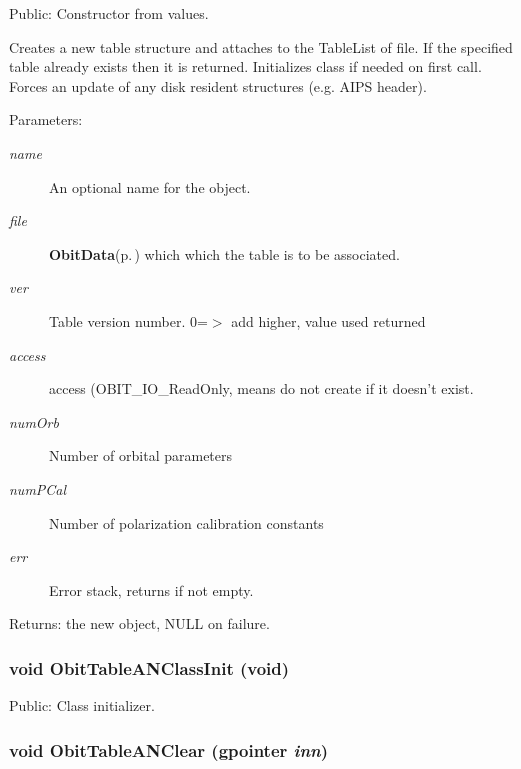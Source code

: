 Public: Constructor from values. 

Creates a new table structure and attaches to the Table\-List of file. If the specified table already exists then it is returned. Initializes class if needed on first call. Forces an update of any disk resident structures (e.g. AIPS header). \begin{Desc}
\item[Parameters:]
\begin{description}
\item[{\em name}]An optional name for the object. \item[{\em file}]{\bf Obit\-Data}{\rm (p.\,\pageref{structObitData})} which which the table is to be associated. \item[{\em ver}]Table version number. 0=$>$ add higher, value used returned \item[{\em access}]access (OBIT\_\-IO\_\-Read\-Only, means do not create if it doesn't exist. \item[{\em num\-Orb}]Number of orbital parameters \item[{\em num\-PCal}]Number of polarization calibration constants \item[{\em err}]Error stack, returns if not empty. \end{description}
\end{Desc}
\begin{Desc}
\item[Returns:]the new object, NULL on failure. \end{Desc}
\subsubsection{\setlength{\rightskip}{0pt plus 5cm}void Obit\-Table\-ANClass\-Init (void)}\label{ObitTableAN_8c_a27}


Public: Class initializer. 

\subsubsection{\setlength{\rightskip}{0pt plus 5cm}void Obit\-Table\-ANClear (gpointer {\em inn})}\label{ObitTableAN_8c_a9}


